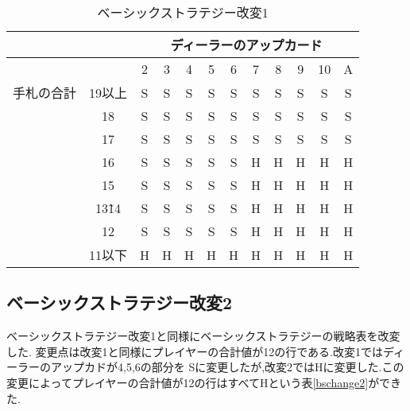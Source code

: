 \begin{table}[htbp]
  \centering
  \caption{ベーシックストラテジー改変1\label{bschange1}}
  \begin{tabular}{|c|c|c|c|c|c|c|c|c|c|c|c|}
    \hline
    \multicolumn{2}{|c|}{} & \multicolumn{10}{|c|}{ディーラーのアップカード} \\ \hline
    \multicolumn{2}{|c|}{} & 2 & 3 & 4 & 5 & 6 & 7 & 8 & 9 & 10 & A \\ \hline
    手札の合計 & 19以上 & S & S & S & S & S & S & S & S & S & S \\ \cline{3-12}
              & 18 & S & S & S & S & S & S & S & S & S & S \\ \cline{3-12}
              & 17 & S & S & S & S & S & S & S & S & S & S \\ \cline{3-12}
              & 16 & S & S & S & S & S & H & H & H & H & H \\ \cline{3-12}
              & 15 & S & S & S & S & S & H & H & H & H & H \\ \cline{3-12}
              & 13\~ 14 & S & S & S & S & S & H & H & H & H & H \\ \cline{3-12}
              & 12 & S & S & S & S & S & H & H & H & H & H \\ \cline{3-12}
              & 11以下 & H & H & H & H & H & H & H & H & H & H \\ \hline
  \end{tabular}
\end{table}

\subsection{ベーシックストラテジー改変2}
ベーシックストラテジー改変1と同様にベーシックストラテジーの戦略表を改変した.
変更点は改変1と同様にプレイヤーの合計値が12の行である.改変1ではディーラーのアップカドが4,5,6の部分を
Sに変更したが,改変2ではHに変更した.この変更によってプレイヤーの合計値が12の行はすべてHという表\ref{bschange2}ができた.

